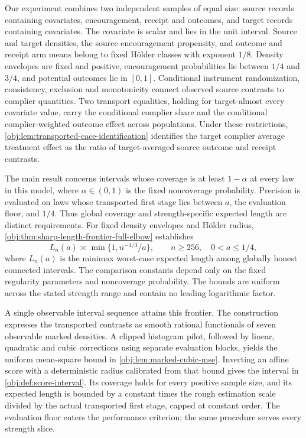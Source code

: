 \documentclass[11pt]{article}
\begin{document}
Our experiment combines two independent samples of equal size: source records containing covariates, encouragement, receipt and outcomes, and target records containing covariates. The covariate is scalar and lies in the unit interval. Source and target densities, the source encouragement propensity, and outcome and receipt arm means belong to fixed Hölder classes with exponent \(1/8\). Density envelopes are fixed and positive, encouragement probabilities lie between \(1/4\) and \(3/4\), and potential outcomes lie in \([0,1]\). Conditional instrument randomization, consistency, exclusion and monotonicity connect observed source contrasts to complier quantities. Two transport equalities, holding for target-almost every covariate value, carry the conditional complier share and the conditional complier-weighted outcome effect across populations. Under these restrictions, \cref{obj:lem:transported-cace-identification} identifies the target complier average treatment effect as the ratio of target-averaged source outcome and receipt contrasts.

The main result concerns intervals whose coverage is at least \(1-\alpha\) at every law in this model, where \(\alpha\in(0,1)\) is the fixed noncoverage probability. Precision is evaluated on laws whose transported first stage lies between \(a\), the evaluation floor, and \(1/4\). Thus global coverage and strength-specific expected length are distinct requirements. For fixed density envelopes and Hölder radius, \cref{obj:thm:sharp-length-frontier-full-elbow} establishes
\[
L_n(a)\asymp \min\{1,n^{-1/3}/a\},
\qquad n\ge256,\quad 0<a\le1/4,
\]
where \(L_n(a)\) is the minimax worst-case expected length among globally honest connected intervals. The comparison constants depend only on the fixed regularity parameters and noncoverage probability. The bounds are uniform across the stated strength range and contain no leading logarithmic factor.

A single observable interval sequence attains this frontier. The construction expresses the transported contrasts as smooth rational functionals of seven observable marked densities. A clipped histogram pilot, followed by linear, quadratic and cubic corrections using separate evaluation blocks, yields the uniform mean-square bound in \cref{obj:lem:marked-cubic-mse}. Inverting an affine score with a deterministic radius calibrated from that bound gives the interval in \cref{obj:def:score-interval}. Its coverage holds for every positive sample size, and its expected length is bounded by a constant times the rough estimation scale divided by the actual transported first stage, capped at constant order. The evaluation floor enters the performance criterion; the same procedure serves every strength slice.
\end{document}
